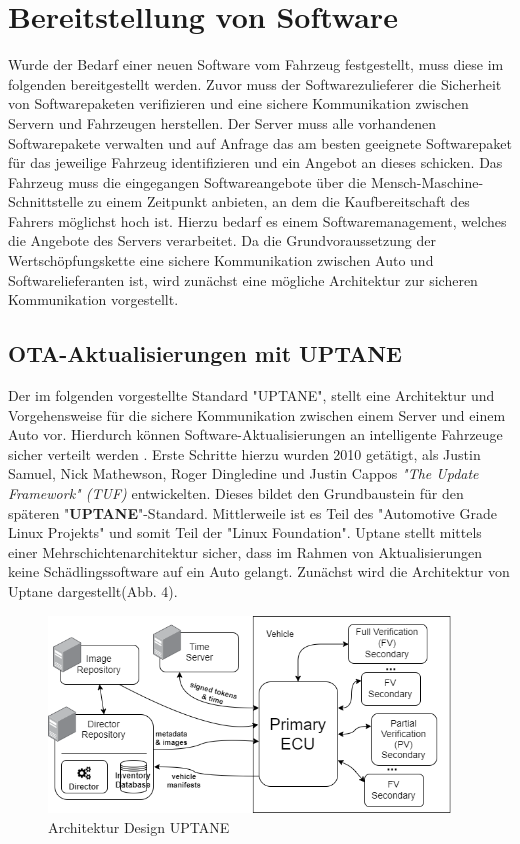 \section{Bereitstellung von Software}
Wurde der Bedarf einer neuen Software vom Fahrzeug festgestellt, muss diese im folgenden bereitgestellt werden. Zuvor muss der Softwarezulieferer die Sicherheit von Softwarepaketen verifizieren und eine sichere Kommunikation zwischen Servern und Fahrzeugen herstellen. Der Server muss alle vorhandenen Softwarepakete verwalten und auf Anfrage das am besten geeignete Softwarepaket für das jeweilige Fahrzeug identifizieren und ein Angebot an dieses schicken. Das Fahrzeug muss die eingegangen Softwareangebote über die Mensch-Maschine-Schnittstelle zu einem Zeitpunkt anbieten, an dem die Kaufbereitschaft des Fahrers möglichst hoch ist. Hierzu bedarf es einem Softwaremanagement, welches die Angebote des Servers verarbeitet. Da die Grundvoraussetzung der Wertschöpfungskette eine sichere Kommunikation zwischen Auto und Softwarelieferanten ist, wird zunächst eine mögliche Architektur zur sicheren Kommunikation vorgestellt.

\subsection{OTA-Aktualisierungen mit UPTANE}\label{3.1}
Der im folgenden vorgestellte Standard "UPTANE", stellt eine Architektur und Vorgehensweise für die sichere Kommunikation zwischen einem Server und einem Auto 
vor. Hierdurch können Software-Aktualisierungen an intelligente Fahrzeuge sicher verteilt werden \cite{uptane}. Erste Schritte hierzu wurden 2010 getätigt, als Justin Samuel, Nick Mathewson, Roger Dingledine und Justin Cappos \textit{"The Update Framework" (TUF)} entwickelten. Dieses bildet den Grundbaustein für den späteren "\textbf{UPTANE}"-Standard. Mittlerweile ist es Teil des "Automotive Grade Linux Projekts" und somit Teil der "Linux Foundation". Uptane stellt mittels einer Mehrschichtenarchitektur sicher, dass im Rahmen von Aktualisierungen keine Schädlingssoftware auf ein Auto gelangt. Zunächst wird die Architektur von Uptane dargestellt(Abb. 4).

\begin{figure}[H]
  \begin{center}
    \includegraphics[width=0.95\textwidth]{../pictures/meta_model_fs-uptane-original.png}
  \end{center}
  \caption{Architektur Design UPTANE \cite{uptane}}
\end{figure}

